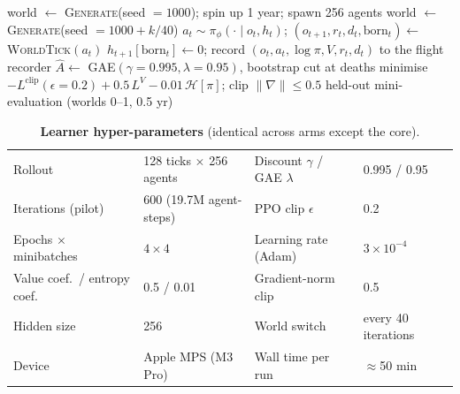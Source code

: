 \documentclass[10pt]{article}
\begin{document}
\begin{algorithm}[t]
\caption{Training loop of the pilots (original \texttt{agents/rppo.py}, since folded into \texttt{agents/ppo.py} with the same defaults)}
\label{alg:train}
\begin{algorithmic}[1]
\State world $\gets$ \textsc{Generate}(seed $=1000$); spin up 1 year; spawn 256 agents
   world $\gets$ \textsc{Generate}(seed $=1000+k/40$) \EndIf
   
     \State $a_t \sim \pi_\phi(\cdot\mid o_t, h_t)$; \quad $(o_{t+1}, r_t, d_t, \text{born}_t) \gets$ \textsc{WorldTick}$(a_t)$
     \State $h_{t+1}[\text{born}_t] \gets 0$; \quad record $(o_t,a_t,\log\pi,V,r_t,d_t)$ to the flight recorder
  \EndFor
  \State $\hat A \gets$ GAE$(\gamma{=}0.995,\lambda{=}0.95)$, bootstrap cut at deaths
   
     \State minimise $-L^{\text{clip}}(\epsilon{=}0.2) + 0.5\,L^{V} - 0.01\,\mathcal H[\pi]$; clip $\lVert\nabla\rVert\le0.5$
  \EndFor
   held-out mini-evaluation (worlds 0--1, 0.5 yr) \EndIf
\EndFor
\end{algorithmic}
\end{algorithm}

\begin{table}[t]
\centering\small
\caption{\textbf{Learner hyper-parameters} (identical across arms except the core).}
\label{tab:hparams}
\begin{tabular}{@{}ll@{\hspace{2em}}ll@{}}
\toprule
Rollout & 128 ticks $\times$ 256 agents & Discount $\gamma$ / GAE $\lambda$ & 0.995 / 0.95\\
Iterations (pilot) & 600 (19.7M agent-steps) & PPO clip $\epsilon$ & 0.2\\
Epochs $\times$ minibatches & $4\times4$ & Learning rate (Adam) & $3\times10^{-4}$\\
Value coef.\ / entropy coef. & 0.5 / 0.01 & Gradient-norm clip & 0.5\\
Hidden size & 256 & World switch & every 40 iterations\\
Device & Apple MPS (M3 Pro) & Wall time per run & $\approx$50 min\\
\bottomrule
\end{tabular}
\end{table}

\end{document}
